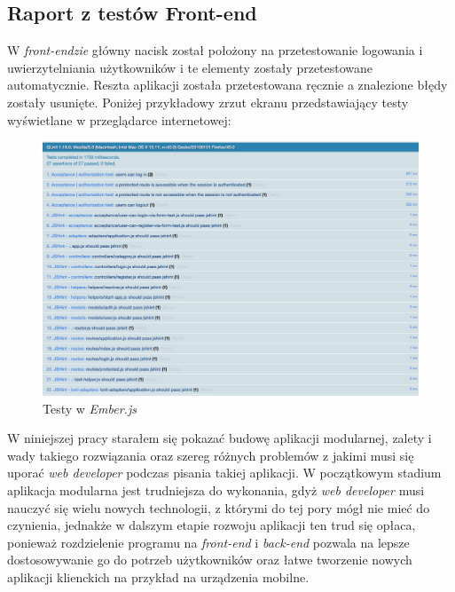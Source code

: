 \documentclass[openright]{xmgr}
\begin{document}
\subsection{Raport z testów Front-end}
W \textit{front-endzie} główny nacisk został położony na przetestowanie logowania i uwierzytelniania użytkowników i te elementy zostały przetestowane automatycznie. Reszta aplikacji została przetestowana ręcznie a znalezione błędy zostały usunięte. Poniżej przykładowy zrzut ekranu przedstawiający testy wyświetlane w przeglądarce internetowej:
\begin{figure}[H]
\centering
\includegraphics[width=1\hsize]{images/ember-testy.png}
\caption{Testy w \textit{Ember.js}\label{RYS.1}}
\end{figure}
\summary
W niniejszej pracy starałem się pokazać budowę aplikacji modularnej, zalety i wady takiego rozwiązania oraz szereg różnych problemów z jakimi musi się uporać \textit{web developer} podczas pisania takiej aplikacji. W początkowym stadium aplikacja modularna jest trudniejsza do wykonania, gdyż \textit{web developer} musi nauczyć się wielu nowych technologii, z którymi do tej pory mógł nie mieć do czynienia, jednakże w dalszym etapie rozwoju aplikacji ten trud się opłaca, ponieważ rozdzielenie programu na \textit{front-end} i \textit{back-end} pozwala na lepsze dostosowywanie go do potrzeb użytkowników oraz łatwe tworzenie nowych aplikacji klienckich na przykład na urządzenia mobilne.
\end{document}
